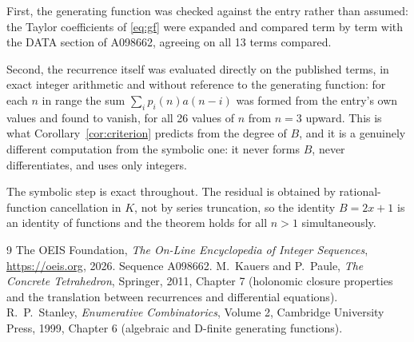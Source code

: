 \documentclass[11pt,a4paper]{article}
\theoremstyle{plain}
\theoremstyle{definition}
\begin{document}
First, the generating function was checked against the entry rather than assumed: the
Taylor coefficients of \eqref{eq:gf} were expanded and compared term by term with the DATA
section of A098662, agreeing on all 13 terms compared.

Second, the recurrence itself was evaluated directly on the published terms, in exact
integer arithmetic and without reference to the generating function: for each $n$ in range
the sum $\sum_{i}p_{i}(n)a(n-i)$ was formed from the entry's own values and found to
vanish, for all 26 values of $n$ from $n=3$ upward. This is what
Corollary~\ref{cor:criterion} predicts from the degree of $B$, and it is a genuinely
different computation from the symbolic one: it never forms $B$, never differentiates, and
uses only integers.

The symbolic step is exact throughout. The residual is obtained by rational-function
cancellation in $K$, not by series truncation, so the identity $B=2 x + 1$ is an
identity of functions and the theorem holds for all $n>1$ simultaneously.

\begin{thebibliography}{9}
 The OEIS Foundation, \emph{The On-Line Encyclopedia of Integer Sequences},
\url{https://oeis.org}, 2026. Sequence A098662.
 M.~Kauers and P.~Paule, \emph{The Concrete Tetrahedron}, Springer, 2011,
Chapter 7 (holonomic closure properties and the translation between recurrences and
differential equations).
 R.~P.~Stanley, \emph{Enumerative Combinatorics}, Volume 2, Cambridge
University Press, 1999, Chapter 6 (algebraic and D-finite generating functions).
\end{thebibliography}
\end{document}
